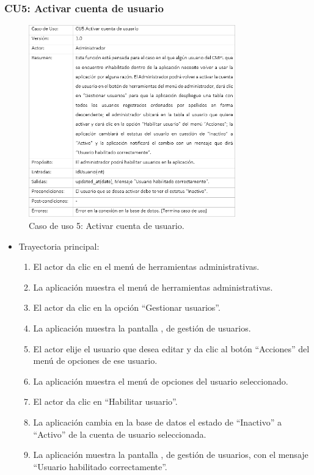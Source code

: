 			
		\subsubsection{CU5: Activar cuenta de usuario}
			\begin{figure}[htbp!]
				\centering
					\includegraphics[width=0.8\textwidth]{images/CU/CU5}
					\caption{Caso de uso 5: Activar cuenta de usuario.}
				\label{Tabla}
			\end{figure}
			
			\begin{itemize}
				\item Trayectoria principal:
					\begin{enumerate}
						\item El actor da clic en el menú de herramientas administrativas.
						\item La aplicación muestra el menú de herramientas administrativas.
						\item El actor da clic en la opción ``Gestionar usuarios''.
						\item La aplicación muestra la pantalla , de gestión de usuarios.
						\item El actor elije el usuario que desea editar y da clic al botón ``Acciones'' del menú de opciones de ese usuario.
						\item La aplicación muestra el menú de opciones del usuario seleccionado.
						\item El actor da clic en ``Habilitar usuario''.
						\item La aplicación cambia en la base de datos el estado de ``Inactivo'' a ``Activo'' de la cuenta de usuario seleccionada.
						\item La aplicación muestra la pantalla , de gestión de usuarios, con el mensaje ``Usuario habilitado correctamente''.
					\end{enumerate}
			\end{itemize}
			
